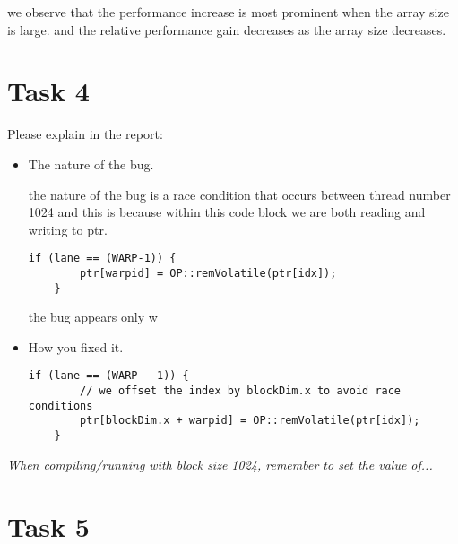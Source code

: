 \documentclass{article}
\begin{document}
  we observe that the performance increase is most prominent when the array size is large. and the relative performance gain decreases as the array size decreases.

\section{Task 4}

Please explain in the report:

\begin{itemize}
  \item The nature of the bug.
  
  the nature of the bug is a race condition that occurs between thread number 1024 and 
  this is because within this code block 
  we are both reading and writing to ptr.
  
  \begin{lstlisting}[language=cuda]
    if (lane == (WARP-1)) { 
        ptr[warpid] = OP::remVolatile(ptr[idx]); 
    }
  \end{lstlisting}

  the bug appears only w
  \item How you fixed it.
  
  \begin{lstlisting}[language=cuda]
    if (lane == (WARP - 1)) {
        // we offset the index by blockDim.x to avoid race conditions
        ptr[blockDim.x + warpid] = OP::remVolatile(ptr[idx]);
    }
  \end{lstlisting}

\end{itemize}

\textit{When compiling/running with block size 1024, remember to set the value of...}

\section{Task 5}
\end{document}
